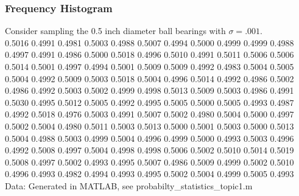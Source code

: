 \documentclass[fleqn]{ltx-talk} %
\newcommand{\sectionIsubsectionIIItitle}{Frequency Histogram}
\begin{document}
	\begin{frame} 
	  \frametitle{\sectionIsubsectionIIItitle}
	 Consider sampling the 0.5 inch diameter ball bearings with $\sigma=.001$. \vspace{5mm}\\
   {\small
   0.5016 0.4991 0.4981 0.5003 0.4988 0.5007 0.4994 0.5000 0.4999 0.4999 0.4988\\ 
   0.4997 0.4991 0.4986 0.5000 0.5018 0.4996 0.5010 0.4991 0.5011 0.5006 0.5006\\
   0.5014 0.5001 0.4997 0.4994 0.5001 0.5009 0.5009 0.4992 0.4983 0.5004 0.5005\\ 
   0.5004 0.4992 0.5009 0.5003 0.5018 0.5004 0.4996 0.5014 0.4992 0.4986 0.5002\\
   0.4986 0.4992 0.5003 0.5002 0.4999 0.4998 0.5013 0.5009 0.5003 0.4986 0.4991\\
   0.5030 0.4995 0.5012 0.5005 0.4992 0.4995 0.5005 0.5000 0.5005 0.4993 0.4987\\ 
   0.4992 0.5018 0.4976 0.5003 0.4991 0.5007 0.5002 0.4980 0.5004 0.5000 0.4997\\
   0.5002 0.5004 0.4980 0.5011 0.5003 0.5013 0.5000 0.5001 0.5003 0.5000 0.5013\\  
   0.5004 0.4988 0.5003 0.4999 0.5004 0.4996 0.4999 0.5000 0.4993 0.5003 0.4996\\  
   0.4992 0.5008 0.4997 0.5004 0.4998 0.4998 0.5006 0.5002 0.5010 0.5014 0.5019\\
   0.5008 0.4997 0.5002 0.4993 0.4995 0.5007 0.4986 0.5009 0.4999 0.5002 0.5010\\  
   0.4996 0.4993 0.4982 0.4994 0.4993 0.4995 0.5002 0.5004 0.4999 0.5005 0.4993\vspace{5mm}\\ 
   }
   {\tiny Data: Generated in MATLAB, see probabilty\_statistics\_topic1.m }
				
			\end{frame}	
\end{document}
